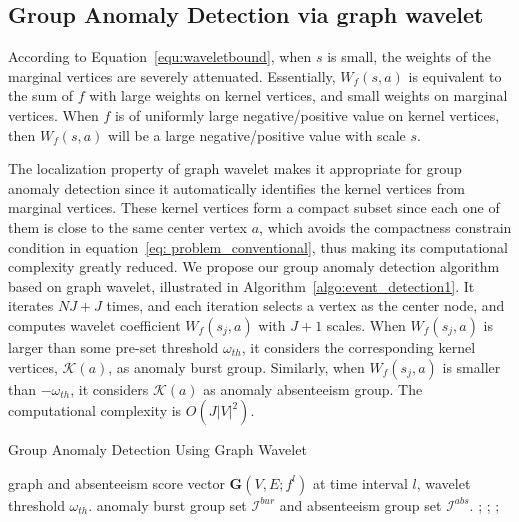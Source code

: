 \documentclass[conference]{IEEEtran}
\begin{document}
\subsection{Group Anomaly Detection via graph wavelet}
\label{sec:Group_Anomaly_Detection_via_graph_wavelet}
According to Equation~\ref{equ:waveletbound}, when $s$ is small, the weights of the marginal vertices are severely attenuated.
Essentially, $W_f(s,a)$ is equivalent to the sum of $f$ with large weights on kernel vertices, and small weights on marginal vertices.
When $f$ is of uniformly large negative/positive value on kernel vertices, then $W_f(s,a)$ will be a large negative/positive value with scale $s$.

The localization property of graph wavelet makes it appropriate for group anomaly detection since it automatically identifies the kernel vertices from marginal vertices. These kernel vertices form a compact subset since each one of them is close to the same center vertex $a$, which avoids the compactness constrain condition in equation~\ref{eq: problem_conventional}, thus making its computational complexity greatly reduced. We propose our group anomaly detection algorithm based on graph wavelet, illustrated in Algorithm~\ref{algo:event_detection1}. It iterates $NJ+J$ times, and each iteration selects a vertex as the center node, and computes wavelet coefficient $W_f(s_j, a)$ with $J+1$ scales. When $W_f(s_j, a)$ is larger than some pre-set threshold $\omega_{th}$, it considers the corresponding kernel vertices, $\mathcal{K}(a)$, as anomaly burst group. Similarly, when $W_f(s_j, a)$ is smaller than $-\omega_{th}$, it considers $\mathcal{K}(a)$ as anomaly absenteeism group. The computational complexity is $O(J|V|^2)$.

\begin{algorithm}[ht]
\centering
\captionsetup{font=scriptsize}
\caption{Group Anomaly Detection Using Graph Wavelet}
{\footnotesize \begin{algorithmic}[1]
 graph and absenteeism score vector $\mathbf{G}(V,E;f^l)$ at time interval $l$, wavelet threshold $\omega_{th}$.
 anomaly burst group set $\mathcal{I}^{bur}$ and absenteeism group set $\mathcal{I}^{abs}$.	
;
;
	    ;
	    \ENDIF
	
	    \ENDIF	
	
\ENDFOR	
{}
\end{algorithmic}}
\label{algo:event_detection1}
\end{algorithm}
\end{document}
